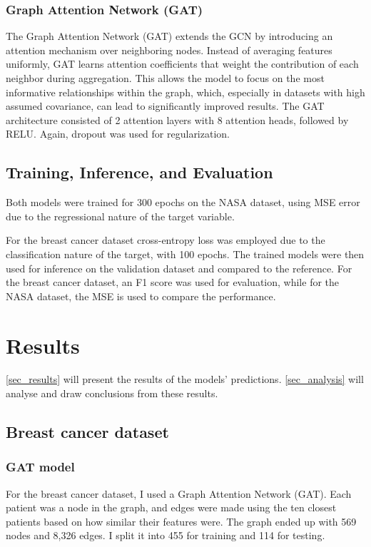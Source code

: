 \documentclass[12pt]{article}
\begin{document}
\subsubsection{Graph Attention Network (GAT)}
The Graph Attention Network (GAT) extends the GCN by introducing an attention mechanism over neighboring nodes. Instead of averaging features uniformly, GAT learns attention coefficients that weight the contribution of each neighbor during aggregation. This allows the model to focus on the most informative relationships within the graph, which, especially in datasets with high assumed covariance, can lead to significantly improved results.
The GAT architecture consisted of 2 attention layers with 8 attention heads, followed by RELU. Again, dropout was used for regularization.

\subsection{Training, Inference, and Evaluation}
Both models were trained for 300 epochs on the NASA dataset, using MSE error due to the regressional nature of the target variable.

For the breast cancer dataset cross-entropy loss was employed due to the classification nature of the target, with 100 epochs.
The trained models were then used for inference on the validation dataset and compared to the reference. For the breast cancer dataset, an F1 score was used for evaluation, while for the NASA dataset, the MSE is used to compare the performance.
\pagebreak

\section{Results} \label{sec_results}
\autoref{sec_results} will present the results of the models' predictions. \autoref{sec_analysis} will analyse and draw conclusions from these results.

\subsection{Breast cancer dataset}
\subsubsection{GAT model}

For the breast cancer dataset, I used a Graph Attention Network (GAT). Each patient was a node in the graph, and edges were made using the ten closest patients based on how similar their features were. The graph ended up with 569 nodes and 8,326 edges. I split it into 455 for training and 114 for testing.
\end{document}

